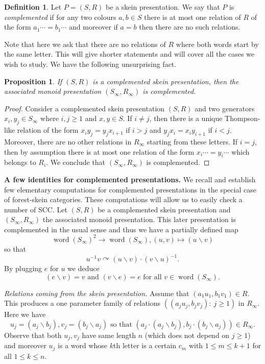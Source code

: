\documentclass[a4paper, 12pt]{amsart}
\numberwithin{equation}{section}
\newtheorem{proposition}[theorem]{Proposition}
\theoremstyle{definition}
\newtheorem{definition}[theorem]{Definition}
\newcommand{\act}{\curvearrowright}
\newcommand{\bs}{\backslash}
\DeclareMathOperator{\word}{word}
\begin{document}
\begin{definition}\label{def:complemented}
Let $P=(S,R)$ be a skein presentation.
We say that $P$ is {\it complemented} if for any two colours $a,b\in S$ there is at most one relation of $R$ of the form $a_1\cdots=b_1\cdots$ and moreover if $a=b$ then there are no such relations.
\end{definition}

Note that here we ask that there are no relations of $R$ where both words start by the same letter. This will give shorter statements and will cover all the cases we wish to study.
We have the following unsurprising fact.

\begin{proposition}
If $(S,R)$ is a complemented skein presentation, then the associated monoid presentation $(S_\infty,R_\infty)$ is complemented.
\end{proposition}

\begin{proof}
Consider a complemented skein presentation $(S,R)$ and two generators $x_i,y_j\in S_\infty$ where $i,j\geq 1$ and $x,y\in S$.
If $i\neq j$, then there is a unique Thompson-like relation of the form $x_iy_j=y_j x_{i+1}$ if $i>j$ and $y_jx_i=x_i y_{i+1}$ if $i<j$.
Moreover, there are no other relations in $R_\infty$ starting from these letters.
If $i=j$, then by assumption there is at most one relation of the form $x_i\cdots=y_i\cdots$ which belongs to $R_i$.
We conclude that $(S_\infty,R_\infty)$ is complemented.
\end{proof}

{\bf A few identities for complemented presentations.}
We recall and establish few elementary computations for complemented presentations in the special case of forest-skein categories.
These computations will allow us to easily check a number of SCC.
Let $(S,R)$ be a complemented skein presentation and $(S_\infty,R_\infty)$ the associated monoid presentation.
This later presentation is complemented in the usual sense and thus we have a partially defined map 
$$\word(S_\infty)^2\to \word(S_\infty), (u,v)\mapsto (u\bs v)$$
so that $$u^{-1} v\act (u\bs v)\cdot (v\bs u)^{-1}.$$
By plugging $e$ for $u$ we deduce
$$(e\bs v) = v \text{ and } (v\bs e) = e \text{ for all } v\in \word(S_\infty).$$

{\it Relations coming from the skein presentation.}
Assume that $(a_1u_1, b_1v_1)\in R$.
This produces a one parameter family of relations $((a_ju_j,b_jv_j) :\ j\geq 1)$ in $R_\infty$.
Here we have 
$$u_j=(a_j\bs b_j), v_j=(b_j\bs a_j) \text{ so that } (a_j\cdot (a_j\bs b_j), b_j\cdot (b_j\bs a_j))\in R_\infty.$$
Observe that both $u_j,v_j$ have same length $n$ (which does not depend on $j\geq 1$) and moreover $u_j$ is a word whose $k$th letter is a certain $c_m$ with $1\leq m\leq k+1$ for all $1\leq k\leq n.$
\end{document}
